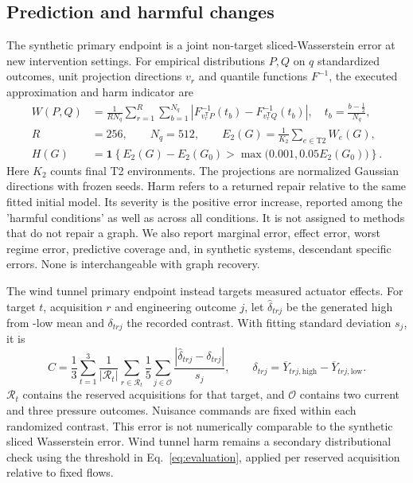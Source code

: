 \documentclass{svproc}
\begin{document}
\subsection{Prediction and harmful changes}
The synthetic primary endpoint is a joint non-target sliced-Wasserstein error at
new intervention settings. For empirical distributions $P,Q$ on $q$ standardized
outcomes, unit projection directions $v_r$ and quantile functions $F^{-1}$, the
executed approximation and harm indicator are
\begin{equation}
\begin{aligned}
 W(P,Q)&=\frac{1}{RN_q}\sum_{r=1}^{R}\sum_{b=1}^{N_q}
   \left|F^{-1}_{v_r^{\mathsf T}P}(t_b)-F^{-1}_{v_r^{\mathsf T}Q}(t_b)\right|,
       \quad t_b=\frac{b-\tfrac12}{N_q},\\
 R&=256,\qquad N_q=512,\qquad
 E_2(G)=\frac{1}{K_2}\sum_{e\in\mathrm{T2}}W_e(G),\\
 H(G)&=\mathbf{1}\left\{E_2(G)-E_2(G_0)>
                              \max\bigl(0.001,0.05E_2(G_0)\bigr)\right\}.
\end{aligned}
\label{eq:evaluation}
\end{equation}
Here $K_2$ counts final T2 environments. The projections are normalized Gaussian
directions with frozen seeds. Harm refers to a returned repair relative to the
same fitted initial model. Its severity is the positive error increase, reported
among the 'harmful conditions' as well as across all conditions. It is not assigned
to methods that do not repair a graph. We also report marginal error, effect
error, worst regime error, predictive coverage and, in synthetic systems,
descendant specific errors. None is interchangeable with graph recovery.

The wind tunnel primary endpoint instead targets measured actuator effects. For
target $t$, acquisition $r$ and engineering outcome $j$, let $\widehat\delta_{trj}$
be the generated high from -low mean and $\delta_{trj}$ the recorded contrast.
With fitting standard deviation $s_j$, it is
\begin{equation}
 C=\frac{1}{3}\sum_{t=1}^{3}\frac{1}{|\mathcal R_t|}
       \sum_{r\in\mathcal R_t}\frac{1}{5}\sum_{j\in\mathcal O}
       \frac{|\widehat\delta_{trj}-\delta_{trj}|}{s_j},
 \qquad \delta_{trj}=\overline Y_{trj,\mathrm{high}}-
                         \overline Y_{trj,\mathrm{low}}.
\label{eq:contrast}
\end{equation}
$\mathcal R_t$ contains the reserved acquisitions for that target, and $\mathcal O$
contains two current and three pressure outcomes. Nuisance commands are fixed
within each randomized contrast. This error is not numerically comparable to
the synthetic sliced Wasserstein error. Wind tunnel harm remains a secondary
distributional check using the threshold in Eq.~\ref{eq:evaluation}, applied per
reserved acquisition relative to fixed flows.
\end{document}
